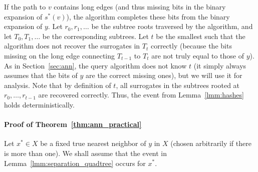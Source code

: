 If the path to $v$ contains long edges (and thus missing bits in the binary expansion of $s^*(v)$), the algorithm completes these bits from the binary expansion of $y$.
Let $r_0,r_1,\ldots$ be the subtree roots traversed by the algorithm, and let $T_0,T_1,\ldots$ be the corresponding subtrees. Let $t$ be the smallest such that the algorithm does not recover the surrogates in $T_t$ correctly (because the bits missing on the long edge connecting $T_{t-1}$ to $T_t$ are not truly equal to those of $y$). As in Section~\ref{sec:ann}, the query algorithm does not know $t$ (it simply always assumes that the bits of $y$ are the correct missing ones), but we will use it for analysis.
Note that by definition of $t$, all surrogates in the subtrees rooted at $r_0,\ldots,r_{t-1}$ are recovered correctly. Thus, the event from Lemma~\ref{lmm:hashes} holds deterministically.

\paragraph{Proof of Theorem~\ref{thm:ann_practical}}
Let $x^*\in X$ be a fixed true nearest neighbor of $y$ in $X$ (chosen arbitrarily if there is more than one). We shall assume that the event in Lemma~\ref{lmm:separation_quadtree} occurs for $x^*$.


